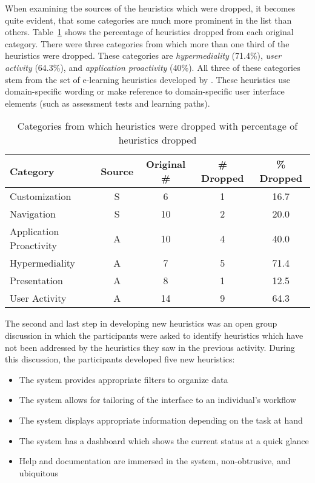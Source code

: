 When examining the sources of the heuristics which were dropped, it becomes quite evident, that some categories are much more prominent in the list than others. Table~\ref{tab:source_dropped_heuristics} shows the percentage of heuristics dropped from each original category. There were three categories from which more than one third of the heuristics were dropped. These categories are \textit{hypermediality} (71.4\%), \textit{user activity} (64.3\%), and \textit{application proactivity} (40\%). All three of these categories stem from the set of e-learning heuristics developed by \citet{Ardito2006}. These heuristics use domain-specific wording or make reference to domain-specific user interface elements (such as assessment tests and learning paths).

\begin{table}[htbp]
	\centering
	\caption{Categories from which heuristics were dropped with percentage of heuristics dropped}
	\label{tab:source_dropped_heuristics}
	\begin{tabular}{lcccc}	\toprule
		\textbf{Category} & \textbf{Source} & \textbf{Original \#} & \textbf{\# Dropped} & \textbf{\% Dropped} \\ \midrule
		Customization 			& S &  6 & 1 & 16.7 \\
		Navigation				& S & 10 & 2 & 20.0 \\
		Application Proactivity	& A & 10 & 4 & 40.0 \\
		Hypermediality			& A &  7 & 5 & 71.4 \\
		Presentation				& A &  8 & 1 & 12.5 \\
		User Activity			& A & 14 & 9 & 64.3 \\
		\bottomrule
	\end{tabular}
\end{table}

The second and last step in developing new heuristics was an open group discussion in which the participants were asked to identify heuristics which have not been addressed by the heuristics they saw in the previous activity. During this discussion, the participants developed five new heuristics:

\begin{itemize}
	\item The system provides appropriate filters to organize data
	\item The system allows for tailoring of the interface to an individual's workflow
	\item The system displays appropriate information depending on the task at hand
	\item The system has a dashboard which shows the current status at a quick glance
	\item Help and documentation are immersed in the system, non-obtrusive, and ubiquitous
\end{itemize}

